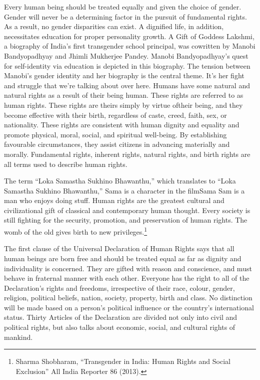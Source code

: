 \begin{multicols}{2}


\noi
Every human being should be treated equally and given the choice of gender. Gender will never
be a determining factor in the pursuit of fundamental rights. As a result, no gender disparities
can exist. A dignified life, in addition, necessitates education for proper personality growth. A
Gift of Goddess Lakshmi, a biography of India's first transgender school principal, was cowritten by Manobi Bandyopadhyay and Jhimli Mukherjee Pandey. Manobi Bandyopadhyay's
quest for self-identity via education is depicted in this biography. The tension between
Manobi's gender identity and her biography is the central theme. It's her fight and struggle that
we're talking about over here. Humans have some natural and natural rights as a result of their
being human. These rights are referred to as human rights. These rights are theirs simply by
virtue oftheir being, and they become effective with their birth, regardless of caste, creed, faith,
sex, or nationality. These rights are consistent with human dignity and equality and promote
physical, moral, social, and spiritual well-being. By establishing favourable circumstances,
they assist citizens in advancing materially and morally. Fundamental rights, inherent rights,
natural rights, and birth rights are all terms used to describe human rights.

\noi
The term “Loka Samastha Sukhino Bhawanthu,” which translates to “Loka Samastha Sukhino
Bhawanthu,” Sama is a character in the filmSama Sam is a man who enjoys doing stuff. Human
rights are the greatest cultural and civilizational gift of classical and contemporary human
thought. Every society is still fighting for the security, promotion, and preservation of human
rights. The womb of the old gives birth to new privileges.\footnote{Sharma Shobharam, “Transgender in India: Human Rights and Social Exclusion” All India Reporter 86 (2013).}

\noi
The first clause of the Universal Declaration of Human Rights says that all human beings are
born free and should be treated equal as far as dignity and individuality is concerned. They are
gifted with reason and conscience, and must behave in fraternal manner with each other.
Everyone has the right to all of the Declaration's rights and freedoms, irrespective of their race,
colour, gender, religion, political beliefs, nation, society, property, birth and class. No
distinction will be made based on a person's political influence or the country's international
status. Thirty Articles of the Declaration are divided not only into civil and political rights, but
also talks about economic, social, and cultural rights of mankind.


\end{multicols}
